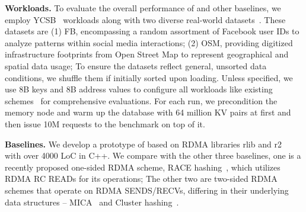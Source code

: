 \noindent\textbf{Workloads.} 
To evaluate the overall performance of \sys and other baselines, we employ YCSB~\cite{ycsb,ycsbc} workloads along with two diverse real-world datasets~\cite{sosd}. These datasets are 
(1) FB, encompassing a random assortment of Facebook user IDs to analyze patterns within social media interactions; (2) OSM, providing digitized infrastructure footprints from Open Street Map to represent geographical and spatial data usage; 
To ensure the datasets reflect general, unsorted data conditions, we shuffle them if initially sorted upon loading.
Unless specified, we use 8B keys and 8B address values to configure all workloads like existing schemes~\cite{rolex, learnedindex} for comprehensive evaluations. 
For each run, we precondition the memory node and warm up the database with 64 million KV pairs at first and then issue 10M requests to the benchmark on top of it.


\noindent\textbf{Baselines.}
We develop a prototype of \sys based on RDMA libraries rlib and r2~\cite{drtmh} with over 4000 LoC in C++. We compare \sys with the other three baselines, one is a recently proposed one-sided RDMA scheme, RACE hashing~\cite{race}, which utilizes RDMA RC READs for its operations; The other two are two-sided RDMA schemes that operate on RDMA SENDS/RECVs, differing in their underlying data structures -- MICA~\cite{herd, mica} and Cluster hashing~\cite{drtmr}.


